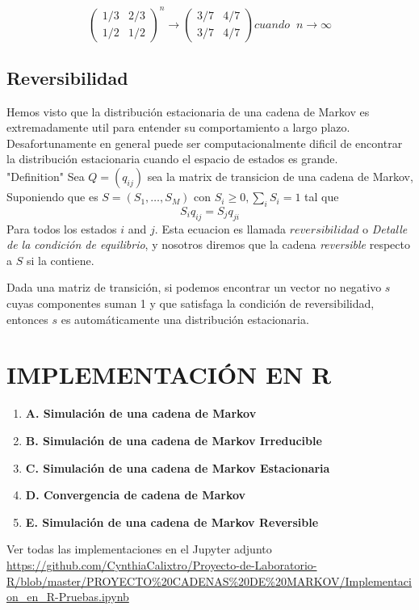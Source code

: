 \documentclass[10pt,a4paper]{article}
\theoremstyle{definition}
\theoremstyle{remark}
\begin{document}
\begin{multicols}{2}
\[
\left( \begin{array}{cccc}
1/3 & 2/3 \\
1/2 & 1/2 \end{array}  \right)^{n}
\rightarrow
\left( \begin{array}{cccc}
3/7 & 4/7 \\
3/7 & 4/7 \end{array}  \right)
cuando \phantom{x} n \rightarrow \infty
\]
\vspace*{1cm}
\subsection{Reversibilidad}
Hemos visto que la distribución estacionaria de una cadena de Markov es extremadamente util para entender su comportamiento a largo plazo. Desafortunamente en general puede ser computacionalmente dificil de encontrar la distribución estacionaria cuando el espacio de estados es grande.\\
"Definition" Sea $Q = (q_{ij})$ sea la matrix de transicion de una cadena de Markov, Suponiendo que es $S=(S_1,\dots,S_M)$ con $S_i\geq0, \sum_{i}S_i = 1$ tal que $$S_{i}q_{ij}=S_{j}q_{ji}$$ Para todos los estados $i$ and $j$. Esta ecuacion es llamada $reversibilidad$ o \textit{Detalle de la condición de equilibrio}, y nosotros diremos que la cadena \textit{reversible} respecto a $S$ si la contiene.

Dada una matriz de transición, si podemos encontrar un vector no negativo $s$ cuyas componentes suman 1 y que satisfaga la condición de reversibilidad, entonces $s$ es automáticamente una distribución estacionaria.


\section{IMPLEMENTACIÓN EN R}
\begin{enumerate}
\item \textbf{A. Simulación de una cadena de Markov}
\item \textbf{B. Simulación de una cadena de Markov Irreducible}
\item \textbf{C. Simulación de una cadena de Markov Estacionaria}
\item \textbf{D. Convergencia de cadena de Markov}
\item \textbf{E. Simulación de una cadena de Markov Reversible}
\end{enumerate}

 Ver todas las implementaciones en el Jupyter adjunto \url{https://github.com/CynthiaCalixtro/Proyecto-de-Laboratorio-R/blob/master/PROYECTO%20CADENAS%20DE%20MARKOV/Implementacion_en_R-Pruebas.ipynb}

\end{multicols}
\end{document}
